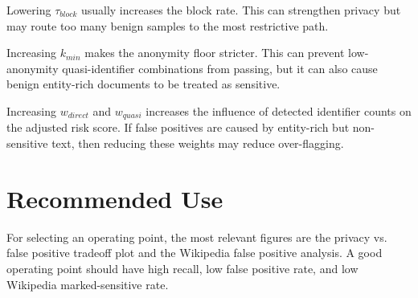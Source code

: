 \documentclass[11pt]{article}
\begin{document}
Lowering $\tau_{block}$ usually increases the block rate. This can strengthen
privacy but may route too many benign samples to the most restrictive path.

Increasing $k_{min}$ makes the anonymity floor stricter. This can prevent
low-anonymity quasi-identifier combinations from passing, but it can also cause
benign entity-rich documents to be treated as sensitive.

Increasing $w_{direct}$ and $w_{quasi}$ increases the influence of detected
identifier counts on the adjusted risk score. If false positives are caused by
entity-rich but non-sensitive text, then reducing these weights may reduce
over-flagging.

\section{Recommended Use}

For selecting an operating point, the most relevant figures are the privacy vs.
false positive tradeoff plot and the Wikipedia false positive analysis. A good
operating point should have high recall, low false positive rate, and low
Wikipedia marked-sensitive rate.
\end{document}
